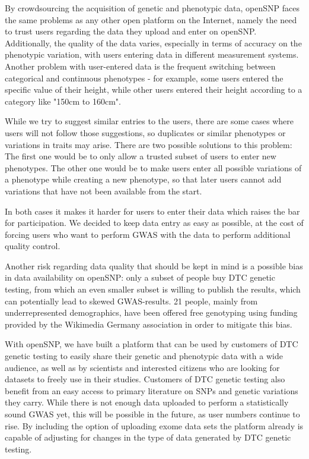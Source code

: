 \documentclass[10pt]{article}
\begin{document}
By crowdsourcing the acquisition of genetic and phenotypic data, openSNP faces the same problems as any other 
open platform on the Internet, namely the need to trust users regarding the data they upload and enter on openSNP. 
Additionally, the quality of the data varies, especially in terms of accuracy on the phenotypic variation, 
with users entering data in different measurement systems. Another problem with user-entered data is the frequent switching between categorical and continuous phenotypes - for example, some users entered the specific value of their height, while other users entered their height according to a category like "150cm to 160cm". 

While we try to suggest similar entries to the users, 
there are some cases where users will not follow those suggestions, so duplicates or similar phenotypes or variations in traits may arise. There are two possible solutions to this problem: The first one would be to only allow a trusted subset of users to enter new phenotypes. The other one 
would be to make users enter all possible variations of a phenotype while creating a new phenotype, so that later users cannot add 
variations that have not been available from the start. 

In both cases it makes it harder 
for users to enter their data which raises the bar for participation.
We decided to keep data entry as easy as possible, at the cost of forcing users who want to perform GWAS with the data to perform additional quality control.

Another risk regarding data quality that should be kept in mind is a possible bias in data availability on openSNP: only a subset of people buy DTC genetic testing, from which an even smaller subset is willing to publish the results, which can potentially lead to skewed GWAS-results. 21 people, mainly from underrepresented demographics, have been offered free genotyping using funding provided by the Wikimedia Germany association in order to mitigate this bias.

With openSNP, we have built a platform that can be used by customers of DTC genetic testing to easily share their genetic and phenotypic 
data with a wide audience, as well as by scientists and interested citizens who are looking for datasets to freely use in their studies.
Customers of DTC genetic testing also benefit from an easy access to primary literature on SNPs and genetic variations they carry. 
While there is not enough data uploaded to perform a statistically sound GWAS yet, this will be possible in the future, as user numbers continue to rise. By including the option of uploading exome data sets the platform already is capable of adjusting for changes in the type of data generated by DTC genetic testing.
\end{document}
